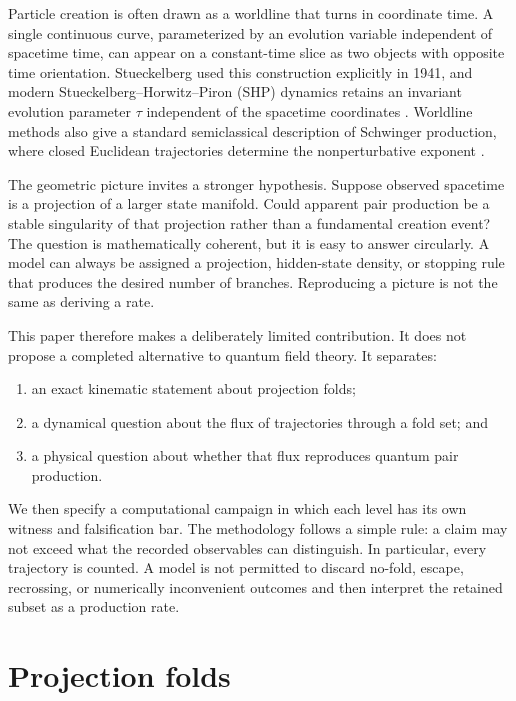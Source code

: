 \documentclass[aps,prd,reprint,nofootinbib,longbibliography]{revtex4-2}
\begin{document}
Particle creation is often drawn as a worldline that turns in coordinate time.  A
single continuous curve, parameterized by an evolution variable independent of
spacetime time, can appear on a constant-time slice as two objects with opposite
time orientation.  Stueckelberg used this construction explicitly in 1941, and
modern Stueckelberg--Horwitz--Piron (SHP) dynamics retains an invariant evolution
parameter $\tau$ independent of the spacetime coordinates
\cite{Stueckelberg1941,Land2017}.  Worldline methods also give a standard
semiclassical description of Schwinger production, where closed Euclidean
trajectories determine the nonperturbative exponent
\cite{Schwinger1951,DunneSchubert2005}.

The geometric picture invites a stronger hypothesis.  Suppose observed spacetime
is a projection of a larger state manifold.  Could apparent pair production be a
stable singularity of that projection rather than a fundamental creation event?
The question is mathematically coherent, but it is easy to answer circularly.  A
model can always be assigned a projection, hidden-state density, or stopping rule
that produces the desired number of branches.  Reproducing a picture is not the
same as deriving a rate.

This paper therefore makes a deliberately limited contribution.  It does not
propose a completed alternative to quantum field theory.  It separates:

\begin{enumerate}[leftmargin=1.5em]
\item an exact kinematic statement about projection folds;
\item a dynamical question about the flux of trajectories through a fold set; and
\item a physical question about whether that flux reproduces quantum pair
production.
\end{enumerate}

We then specify a computational campaign in which each level has its own witness
and falsification bar.  The methodology follows a simple rule: a claim may not
exceed what the recorded observables can distinguish.  In particular, every
trajectory is counted.  A model is not permitted to discard no-fold, escape,
recrossing, or numerically inconvenient outcomes and then interpret the retained
subset as a production rate.

\section{Projection folds}
\end{document}
